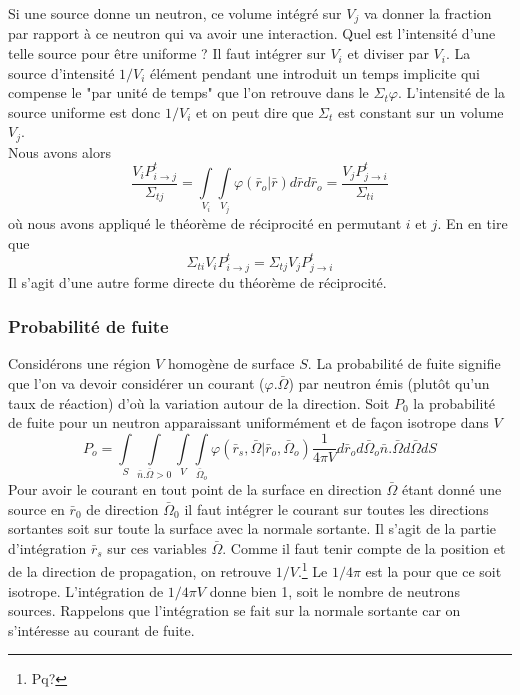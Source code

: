 Si une source donne un neutron, ce volume intégré sur $V_j$ va donner la fraction par rapport à ce 
neutron qui va avoir une interaction. Quel est l'intensité d'une telle source pour être uniforme ? Il 
faut intégrer sur $V_i$ et diviser par $V_i$. La source d'intensité $1/V_i$ élément pendant une 
introduit un temps implicite qui compense le "par unité de temps" que l'on retrouve dans le 
$\Sigma_t\varphi$. L'intensité de la source uniforme est donc $1/V_i$ et on peut dire que 
$\Sigma_t$ est constant sur un volume $V_j$.\\

Nous avons alors
\begin{equation}
\frac{{{V_i}P_{i \to j}^t}}{{{\Sigma _{tj}}}} = \int\limits_{{V_i}}   \int\limits_{{V_j}}   \varphi ({\bar r_o}|\bar r)d\bar rd{\bar r_o} = \frac{{{V_j}P_{j \to i}^t}}{{{\Sigma _{ti}}}}
\end{equation}
où nous avons appliqué le théorème de réciprocité en permutant $i$ et $j$. En en tire que
\begin{equation}
{\Sigma _{ti}}{V_i}P_{i \to j}^t = {\Sigma _{tj}}{V_j}P_{j \to i}^t
\end{equation}
Il s'agit d'une autre forme directe du théorème de réciprocité.

\subsubsection{Probabilité de fuite}
Considérons une région $V$ homogène de surface $S$. La probabilité de fuite signifie que l'on va 
devoir considérer un courant ($\varphi.\bar\Omega$) par neutron émis (plutôt qu'un taux de réaction)
d'où la variation autour de la direction. Soit $P_0$ la probabilité de fuite pour un neutron apparaissant uniformément et de façon isotrope dans $V$
\begin{equation}
{P_o} = \int\limits_S    \int\limits_{\bar n.\bar \Omega  > 0}    \int\limits_V   \int\limits_{{{\bar \Omega }_o}}    \varphi ({\bar r_s},\bar \Omega |{\bar r_o},{\bar \Omega _o})\frac{1}{{4\pi V}}d{\bar r_o}d{\bar \Omega _o}\bar n.\bar \Omega d\bar \Omega dS
\end{equation}
Pour avoir le courant en tout point de la surface en direction $\bar\Omega$ étant donné une source
en $\bar r_0$ de direction $\bar\Omega_0$ il faut intégrer le courant sur toutes les directions 
sortantes soit sur toute la surface avec la normale sortante. Il s'agit de la partie d'intégration 
$\bar r_s$ sur ces variables $\bar\Omega$. Comme il faut tenir compte de la position et de la 
direction de propagation, on retrouve $1/V$.\footnote{Pq?} Le $1/4\pi$ est la pour que ce soit isotrope. L'intégration de $1/4\pi V$ donne bien 1, soit le nombre de neutrons sources. Rappelons que 
l'intégration se fait sur la normale sortante car on s'intéresse au courant de fuite.\\

